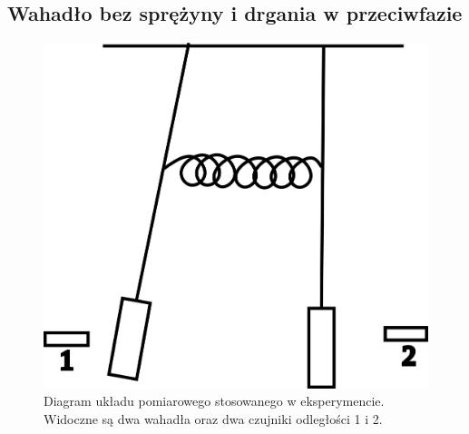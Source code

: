 \documentclass[12pt]{article}
\begin{document}
\subsection{Wahadło bez sprężyny i drgania w przeciwfazie}

\begin{figure}[H]
	\centering
	\includegraphics[scale=1]{diagram}
	\caption{Diagram układu pomiarowego stosowanego w eksperymencie. Widoczne są dwa wahadła oraz dwa czujniki odległości 1 i 2.}
	\label{fig:diagram}
\end{figure}
\end{document}

